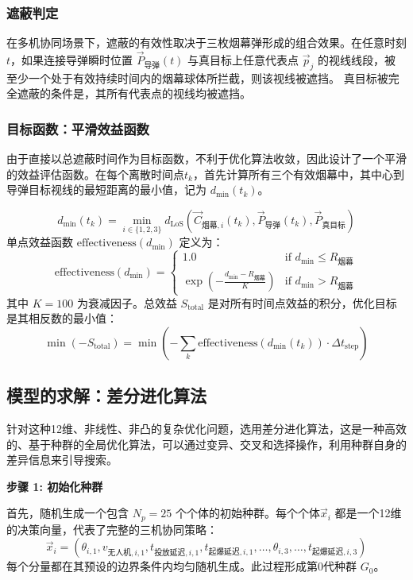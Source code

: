 \documentclass[5pt, withoutpreface,bwprint]{cumcmthesis} %
\begin{document}
\subsubsection{遮蔽判定}
在多机协同场景下，遮蔽的有效性取决于三枚烟幕弹形成的组合效果。在任意时刻$t$，如果连接导弹瞬时位置 $\vec{P}_{\text{导弹}}(t)$ 与真目标上任意代表点 $\vec{p}_j$ 的视线线段，被至少一个处于有效持续时间内的烟幕球体所拦截，则该视线被遮挡。
真目标被完全遮蔽的条件是，其所有代表点的视线均被遮挡。
\subsubsection{目标函数：平滑效益函数}
由于直接以总遮蔽时间作为目标函数，不利于优化算法收敛，因此设计了一个平滑的效益评估函数。在每个离散时间点$t_k$，首先计算所有三个有效烟幕中，其中心到导弹目标视线的最短距离的最小值，记为 $d_{\min}(t_k)$。


\begin{equation}
 d_{\min}(t_k) = \min_{i \in \{1,2,3\}} d_{\text{LoS}}(\vec{C}_{\text{烟幕},i}(t_k), \vec{P}_{\text{导弹}}(t_k), \vec{P}_{\text{真目标}}) \end{equation}
单点效益函数 $\text{effectiveness}(d_{\min})$ 定义为：
\begin{equation}
\text{effectiveness}(d_{\min}) = 
\begin{cases} 
1.0 & \text{if } d_{\min} \le R_{\text{烟幕}} \\
\exp\left(-\frac{d_{\min} - R_{\text{烟幕}}}{K}\right) & \text{if } d_{\min} > R_{\text{烟幕}}
\end{cases}
\end{equation}
其中 $K=100$ 为衰减因子。总效益 $S_{\text{total}}$ 是对所有时间点效益的积分，优化目标是其相反数的最小值：
\begin{equation}
\min(-S_{\text{total}}) = \min \left( -\sum_{k} \text{effectiveness}(d_{\min}(t_k)) \cdot \Delta t_{\text{step}} \right)
\end{equation}
\subsection{模型的求解：差分进化算法}
针对这种12维、非线性、非凸的复杂优化问题，选用差分进化算法，这是一种高效的、基于种群的全局优化算法，可以通过变异、交叉和选择操作，利用种群自身的差异信息来引导搜索。



    \textbf{步骤 1: 初始化种群}
    
    首先，随机生成一个包含 $N_p=25$ 个个体的初始种群。每个个体$\vec{x}_i$ 都是一个12维的决策向量，代表了完整的三机协同策略：
    \begin{equation} \vec{x}_i = (\theta_{i,1}, v_{\text{无人机},i,1}, t_{\text{投放延迟},i,1}, t_{\text{起爆延迟},i,1}, \dots, \theta_{i,3}, \dots, t_{\text{起爆延迟},i,3}) \end{equation}
    每个分量都在其预设的边界条件内均匀随机生成。此过程形成第0代种群 $G_0$。
    
\end{document}

